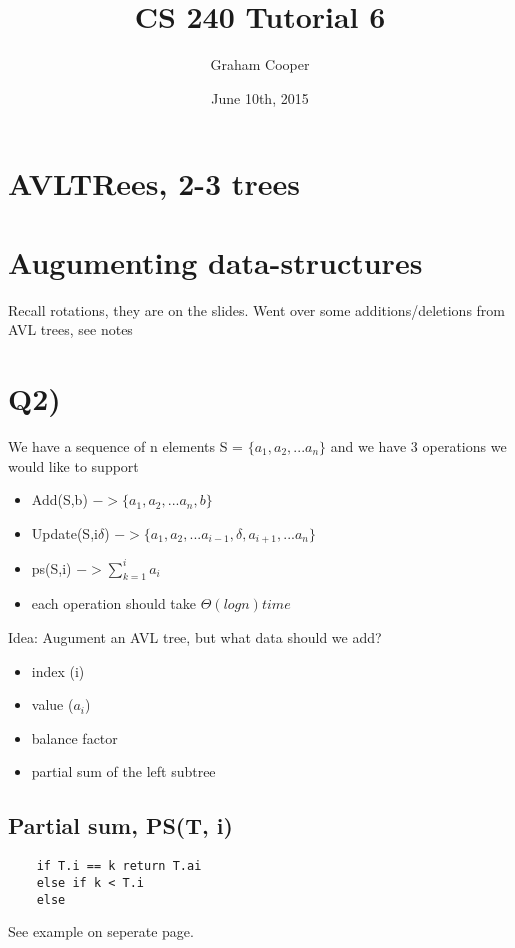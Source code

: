 \documentclass[12pt]{article}
\title{\vspace{-15ex}CS 240 Tutorial 6\vspace{-1ex}}
\date{June 10th, 2015}
\author{Graham Cooper}
\begin{document}
	\maketitle
	\section*{AVLTRees, 2-3 trees}
	\section*{Augumenting data-structures}
	
	Recall rotations, they are on the slides. Went over some additions/deletions from AVL trees, see notes\\
	
	\section*{Q2)}
	We have a sequence of n elements S = $\{a_1, a_2, ... a_n\}$ and we have 3 operations we would like to support\\
	\begin{itemize}
		\item Add(S,b) $-> \{a_1, a_2, ...a_n, b\}$
		\item Update(S,i$\delta$) $-> \{a_1, a_2, ... a_{i-1}, \delta, a_{i+1}, ... a_n\}$
		\item ps(S,i) $-> \sum_{k=1}^{i}a_i$
		\item each operation should take $\Theta(logn) time$
	\end{itemize}
	
	Idea: Augument an AVL tree, but what data should we add?
	\begin{itemize}
		\item index (i)
		\item value ($a_i$)
		\item balance factor
		\item partial sum of the left subtree
	\end{itemize}
	
	\subsection*{Partial sum, PS(T, i)}
	\begin{verbatim}
	if T.i == k return T.ai
	else if k < T.i 
	else 
	\end{verbatim}
	See example on seperate page.\\
	
	
\end{document}
